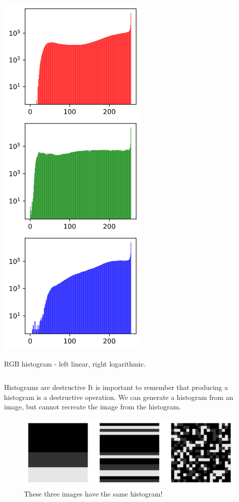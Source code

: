 \documentclass[9pt, aspectratio=169]{beamer}
\begin{document}
\begin{frame}
\begin{columns}
\begin{column}{0.5\textwidth}
            \includegraphics[height=.785\textheight]{RGBhistolog.png}

            \small{\color{gray}RGB histogram - left linear, right logarithmic.}
        \end{column}
    \end{columns}
\end{frame}

\begin{frame}
    {Histograms are destructive}
    It is important to remember that producing a histogram is a destructive operation. We can generate a histogram from an image, but cannot recreate the image from the histogram.

    \begin{figure}
        \includegraphics[width=.5\textwidth]{samehisto.png}
        \caption{These three images have the same histogram!}
    \end{figure}
\end{frame}
\end{document}
